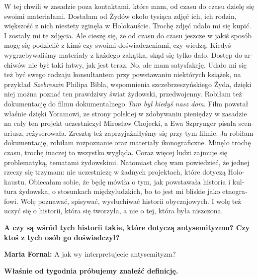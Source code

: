 \begin{otherlanguage}{ngerman}
W tej chwili w zasadzie poza kontaktami, które mam, od czasu do czasu dzielę się swoimi materiałami. Dostałam od Żydów około tysiąca zdjęć ich, ich rodzin, większość z nich niestety zginęła w Holokauście. Trochę zdjęć udało mi się kupić. I zostały mi te zdjęcia. Ale cieszę się, że od czasu do czasu jeszcze w jakiś sposób mogę się podzielić z kimś czy swoimi doświadczeniami, czy wiedzą. Kiedyś wygrzebywaliśmy materiały z każdego zakątka, skąd się tylko dało. Dostęp do archiwów nie był taki łatwy, jak jest teraz. No, ale mam satysfakcję. Udało mi się też być swego rodzaju konsultantem przy powstawaniu niektórych książek, na przykład \textit{Szebreszin} Philipa Bibla, wspomnienia szczebrzeszyńskiego Żyda, dzięki niej można poznać ten prawdziwy świat żydowski, przedwojenny. Robiłam też dokumentację do filmu dokumentalnego \textit{Tam był kiedyś nasz dom}. Film powstał właśnie dzięki Yoramowi, ze strony polskiej w zdobywaniu pieniędzy w zasadzie na cały ten projekt uczestniczył Mirosław Chojecki, a Ewa Szprynger pisała scenariusz, reżyserowała. Zresztą też zaprzyjaźniłyśmy się przy tym filmie. Ja robiłam dokumentację, robiłam rozpoznanie oraz materiały ikonograficzne. Minęło trochę czasu, trochę inaczej to wszystko wygląda. Coraz więcej ludzi zajmuje się problematyką, tematami żydowskimi. Natomiast chcę wam powiedzieć, że jednej rzeczy się trzymam: nie uczestniczę w żadnych projektach, które dotyczą Holokaustu. Obiecałam sobie, że będę mówiła o tym, jak powstawała historia i kultura żydowska, o stosunkach międzyludzkich, bo to jest mi bliskie jako etnografowi. Wolę poznawać, spisywać, wysłuchiwać historii obyczajowych. I wolę też uczyć się o historii, która się tworzyła, a nie o tej, która była niszczona. 

\textbf{A czy są wśród tych historii takie, które dotyczą antysemityzmu? Czy ktoś z tych osób go doświadczył?}
 
\textbf{Maria Fornal:} A jak wy interpretujecie antysemityzm?

\textbf{Właśnie od tygodnia próbujemy znaleźć definicję.}


\end{otherlanguage}
